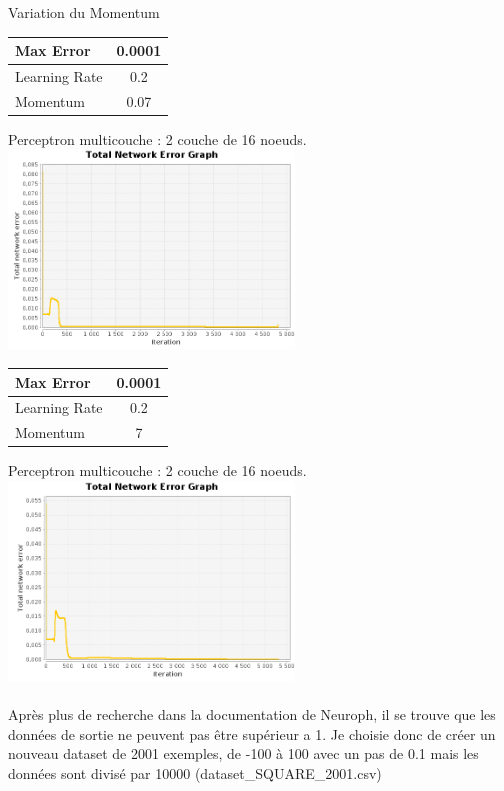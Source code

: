 \documentclass[10pt]{report}
\begin{document}
\begin{center}
Variation du Momentum\\
\begin{tabular}{|l|c|}
	\hline
	Max Error & 0.0001 \\
	\hline
	Learning Rate & 0.2 \\
	\hline
	Momentum & 0.07 \\
	\hline
\end{tabular}

Perceptron multicouche : 2 couche de 16 noeuds.\\
\includegraphics[height=200px]{img/SQUARE_16_16_101_m007.png}\\

\begin{tabular}{|l|c|}
	\hline
	Max Error & 0.0001 \\
	\hline
	Learning Rate & 0.2 \\
	\hline
	Momentum & 7 \\
	\hline
\end{tabular}

Perceptron multicouche : 2 couche de 16 noeuds.\\
\includegraphics[height=200px]{img/SQUARE_16_16_101_m7.png}\\
\end{center}

\paragraph{}
Après plus de recherche dans la documentation de Neuroph, il se trouve que les données de sortie ne peuvent pas être supérieur a 1.
Je choisie donc de créer un nouveau dataset de 2001 exemples, de -100 à 100 avec un pas de 0.1 mais les données sont divisé par 10000 (dataset\_SQUARE\_2001.csv)
\end{document}
